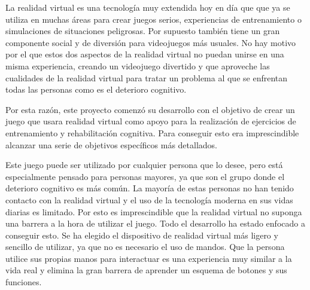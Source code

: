 










La realidad virtual es una tecnología muy extendida hoy en día que que ya se utiliza en muchas áreas para crear juegos serios, experiencias de entrenamiento o simulaciones de situaciones peligrosas. Por supuesto también tiene un gran componente social y de diversión para videojuegos más usuales. No hay motivo por el que estos dos aspectos de la realidad virtual no puedan unirse en una misma experiencia, creando un videojuego divertido y que aproveche las cualidades de la realidad virtual para tratar un problema al que se enfrentan todas las personas como es el deterioro cognitivo.

Por esta razón, este proyecto comenzó su desarrollo con el objetivo de crear un juego que usara realidad virtual como apoyo para la realización de ejercicios de entrenamiento y rehabilitación cognitiva. Para conseguir esto era imprescindible alcanzar una serie de objetivos específicos más detallados. 

Este juego puede ser utilizado por cualquier persona que lo desee, pero está especialmente pensado para personas mayores, ya que son el grupo donde el deterioro cognitivo es más común. La mayoría de estas personas no han tenido contacto con la realidad virtual y el uso de la tecnología moderna en sus vidas diarias es limitado. Por esto es imprescindible que la realidad virtual no suponga una barrera a la hora de utilizar el juego. Todo el desarrollo ha estado enfocado a conseguir esto. Se ha elegido el dispositivo de realidad virtual más ligero y sencillo de utilizar, ya que no es necesario el uso de mandos. Que la persona utilice sus propias manos para interactuar es una experiencia muy similar a la vida real y elimina la gran barrera de aprender un esquema de botones y sus funciones.


